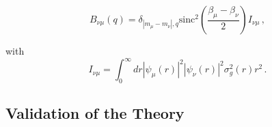 \documentclass[aps,prl,twocolumn, amsmath,amssymb,superscriptaddress]{revtex4-2}
\begin{document}
\begin{equation}
   B_{\nu\mu}(q) = 
        \delta_{|m_\mu-m_\nu|,q} 
        \text{sinc}^2\left(\frac{\beta_\mu-\beta_\nu}{2}\right)
        I_{\nu\mu} \, ,
    \label{eq:coupling}
\end{equation}

with 
\begin{equation}
I_{\nu\mu} = 
    \int_0^\infty dr 
        \left|\psi_\mu(r)\right|^2 
        \left|\psi_\nu(r)\right|^2 
        \sigma^2_g(r) r^2 \, .
\end{equation}



\subsection*{Validation of the Theory}
\end{document}

